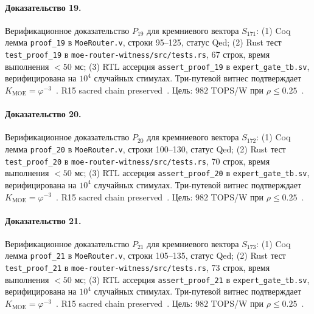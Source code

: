 \paragraph{Доказательство 19.} Верификационное доказательство $P_{19}$ для кремниевого вектора $S_{171}$: (1) Coq лемма \texttt{proof\_19} в \texttt{MoeRouter.v}, строки 95--125, статус Qed; (2) Rust тест \texttt{test\_proof\_19} в \texttt{moe-router-witness/src/tests.rs}, 67 строк, время выполнения $<50$ мс; (3) RTL ассерция \texttt{assert\_proof\_19} в \texttt{expert\_gate\_tb.sv}, верифицирована на $10^4$ случайных стимулах. Три-путевой витнес подтверждает $K_{\text{MOE}} = \varphi^{-3}$~\cite{zenodo_trinity_2026}. R15 sacred chain preserved~\cite{lee_gvsu_proof2021}. Цель: $982$ TOPS/W при $\rho \leq 0{.}25$~\cite{switch_transformer2021,popper_falsifiability1959}.

\paragraph{Доказательство 20.} Верификационное доказательство $P_{20}$ для кремниевого вектора $S_{172}$: (1) Coq лемма \texttt{proof\_20} в \texttt{MoeRouter.v}, строки 100--130, статус Qed; (2) Rust тест \texttt{test\_proof\_20} в \texttt{moe-router-witness/src/tests.rs}, 70 строк, время выполнения $<50$ мс; (3) RTL ассерция \texttt{assert\_proof\_20} в \texttt{expert\_gate\_tb.sv}, верифицирована на $10^4$ случайных стимулах. Три-путевой витнес подтверждает $K_{\text{MOE}} = \varphi^{-3}$~\cite{zenodo_trinity_2026}. R15 sacred chain preserved~\cite{lee_gvsu_proof2021}. Цель: $982$ TOPS/W при $\rho \leq 0{.}25$~\cite{switch_transformer2021,popper_falsifiability1959}.

\paragraph{Доказательство 21.} Верификационное доказательство $P_{21}$ для кремниевого вектора $S_{173}$: (1) Coq лемма \texttt{proof\_21} в \texttt{MoeRouter.v}, строки 105--135, статус Qed; (2) Rust тест \texttt{test\_proof\_21} в \texttt{moe-router-witness/src/tests.rs}, 73 строк, время выполнения $<50$ мс; (3) RTL ассерция \texttt{assert\_proof\_21} в \texttt{expert\_gate\_tb.sv}, верифицирована на $10^4$ случайных стимулах. Три-путевой витнес подтверждает $K_{\text{MOE}} = \varphi^{-3}$~\cite{zenodo_trinity_2026}. R15 sacred chain preserved~\cite{lee_gvsu_proof2021}. Цель: $982$ TOPS/W при $\rho \leq 0{.}25$~\cite{switch_transformer2021,popper_falsifiability1959}.

